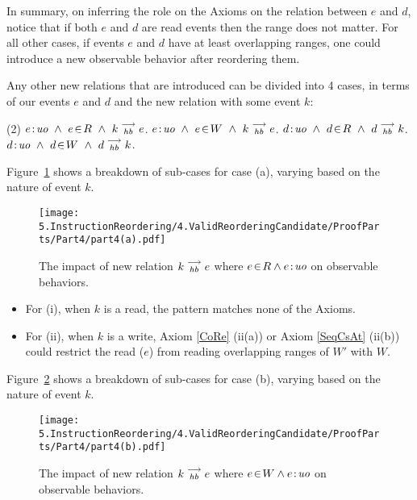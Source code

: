     In summary, on inferring the role on the Axioms on the relation between $e$ and $d$, notice that if both $e$ and $d$ are read events then the range does not matter. For all other cases, if events $e$ and $d$ have at least overlapping ranges, one could introduce a new observable behavior after reordering them.
    
    Any other new relations that are introduced can be divided into 4 cases, in terms of our events $e$ and $d$ and the new relation with some event $k$:
    \begin{tasks}(2)
        \task  $\et{e}{uo} \ \wedge \ \event{e}{R} \ \wedge \ \reln{k}{hb}{e}$.
        \task  $e\!:\!\textit{uo} \ \wedge \ e\!\in\!W \ \wedge \ k\stackrel{\longrightarrow}{_{hb}}e$.
        \task  $\et{d}{uo} \ \wedge \ \event{d}{R} \ \wedge \ \reln{d}{hb}{k}$.
        \task  $d\!:\!\textit{uo} \ \wedge \ d\!\in\!W \ \wedge \ d\stackrel{\longrightarrow}{_{hb}}k$.
    \end{tasks}
    
    Figure~\ref{reord:case1} shows a breakdown of sub-cases for case (a), varying based
    on the nature of event $k$.
    \begin{figure}[H]
        \centering
        \texttt{[image: 5.InstructionReordering/4.ValidReorderingCandidate/ProofParts/Part4/part4(a).pdf]}
        \caption{The impact of new relation $k\stackrel{\longrightarrow}{_{hb}}e$ where $e\!\in\!R \wedge e\!:\!\textit{uo}$ on observable behaviors.}
        \label{reord:case1}
    \end{figure}
    
    \begin{itemize}
        
        \item For (i), when $k$ is a read, the pattern matches none of the Axioms.
        \item For (ii), when $k$ is a write, Axiom \ref{CoRe} (ii(a)) or Axiom \ref{SeqCsAt} (ii(b)) could restrict the read ($e$) from reading overlapping ranges of $W'$ with $W$.
    \end{itemize}
    
    Figure~\ref{reord:case2} shows a breakdown of sub-cases for case (b), varying based
    on the nature of event $k$.
    \begin{figure}[H]
        \centering
        \texttt{[image: 5.InstructionReordering/4.ValidReorderingCandidate/ProofParts/Part4/part4(b).pdf]}
        \caption{The impact of new relation $k\stackrel{\longrightarrow}{_{hb}}e$ where $e\!\in\!W \wedge e\!:\!\textit{uo}$ on observable behaviors.}
        \label{reord:case2}
    \end{figure}
          
